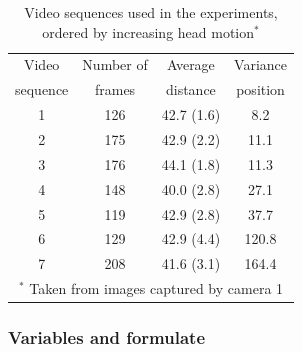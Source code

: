 \documentclass[twoside,twocolumn]{article}
\begin{document}
\begin{table}[h!]\footnotesize
\centering
\caption{Video sequences used in the experiments, ordered by increasing head motion$^\textbf{*}$ \citep{Deniz10}} \label{Table:1}
\addtolength{\tabcolsep}{4.8pt}
\begin{tabular*}{7.95cm}{cccc}
	\toprule[0.75pt]
	 Video   & Number of &  Average   &                   Variance                   \\
	sequence &  frames   &  distance  &                   position                   \\ 
	\midrule[0.5pt]
	   1     &    126    & 42.7 (1.6) &                     8.2                      \\
	   2     &    175    & 42.9 (2.2) &                     11.1                     \\
	   3     &    176    & 44.1 (1.8) &                     11.3                     \\
	   4     &    148    & 40.0 (2.8) &                     27.1                     \\
	   5     &    119    & 42.9 (2.8) &                     37.7                     \\
	   6     &    129    & 42.9 (4.4) &                    120.8                     \\
	   7     &    208    & 41.6 (3.1) &                    164.4                     \\ 
	\bottomrule[0.75pt]
	\multicolumn{4}{p{6cm}}{\scriptsize $^*$ Taken from images captured by camera 1}
\end{tabular*}
\end{table}


\subsubsection{Variables and formulate}
\end{document}
